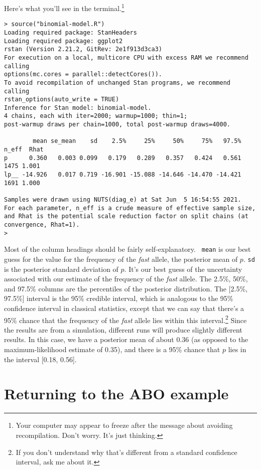 \noindent Here's what you'll see in the terminal.\footnote{Your
  computer may appear to freeze after the message about avoiding
  recompilation. Don't worry. It's just thinking.}

\begin{verbatim}
> source("binomial-model.R")
Loading required package: StanHeaders
Loading required package: ggplot2
rstan (Version 2.21.2, GitRev: 2e1f913d3ca3)
For execution on a local, multicore CPU with excess RAM we recommend calling
options(mc.cores = parallel::detectCores()).
To avoid recompilation of unchanged Stan programs, we recommend calling
rstan_options(auto_write = TRUE)
Inference for Stan model: binomial-model.
4 chains, each with iter=2000; warmup=1000; thin=1; 
post-warmup draws per chain=1000, total post-warmup draws=4000.

        mean se_mean    sd    2.5%     25%     50%     75%   97.5% n_eff  Rhat
p      0.360   0.003 0.099   0.179   0.289   0.357   0.424   0.561  1475 1.001
lp__ -14.926   0.017 0.719 -16.901 -15.088 -14.646 -14.470 -14.421  1691 1.000

Samples were drawn using NUTS(diag_e) at Sat Jun  5 16:54:55 2021.
For each parameter, n_eff is a crude measure of effective sample size,
and Rhat is the potential scale reduction factor on split chains (at 
convergence, Rhat=1).
>
\end{verbatim}

Most of the column headings should be fairly self-explanatory. {\tt
  mean} is our best guess for the value for the frequency of the {\it
  fast\/} allele, the posterior mean of $p$. {\tt sd} is the posterior
standard deviation of $p$. It's our best guess of the uncertainty
associated with our estimate of the frequency of the {\it fast\/}
allele. The 2.5\%, 50\%, and 97.5\% columns are the percentiles of the
posterior distribution. The [2.5\%, 97.5\%] interval is the 95\%
credible interval, which is analogous to the 95\% confidence interval
in classical statistics, except that we can say that there's a 95\%
chance that the frequency of the {\it fast\/} allele lies within this
interval.\footnote{If you don't understand why that's different from a
  standard confidence interval, ask me about it.} Since the results
are from a simulation, different runs will produce slightly different
results. In this case, we have a posterior mean of about 0.36 (as
opposed to the maximum-likelihood estimate of 0.35), and there is a
95\% chance that $p$ lies in the interval [0.18, 0.56].

\section*{Returning to the ABO example}

